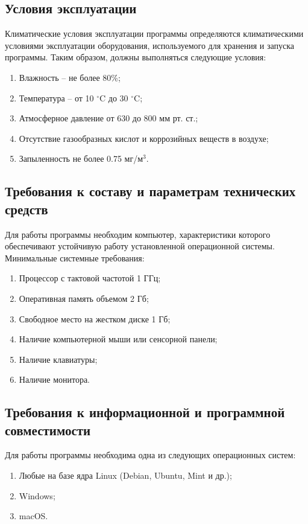 \documentclass[techtask]{espd}
\begin{document}
\subsection{Условия эксплуатации}
Климатические условия эксплуатации программы определяются климатическими условиями эксплуатации оборудования, используемого для хранения и запуска программы. Таким образом, должны выполняться следующие условия:

\begin{enumerate}
\item Влажность -- не более 80\%;
\item Температура -- от 10 $^\circ$C до 30 $^\circ$C;
\item Атмосферное давление от 630 до 800 мм рт. ст.;
\item Отсутствие газообразных кислот и коррозийных веществ в воздухе;
\item Запыленность не более 0.75 мг/м$^3$.
\end{enumerate}

\subsection{Требования к составу и параметрам технических средств}
Для работы программы необходим компьютер, характеристики которого обеспечивают устойчивую работу установленной операционной системы. Минимальные системные требования:

\begin{enumerate}
\item Процессор с тактовой частотой 1 ГГц;
\item Оперативная память объемом 2 Гб;
\item Свободное место на жестком диске 1 Гб;
\item Наличие компьютерной мыши или сенсорной панели;
\item Наличие клавиатуры;
\item Наличие монитора.
\end{enumerate}

\subsection{Требования к информационной и программной совместимости}
Для работы программы необходима одна из следующих операционных систем:

\begin{enumerate}
\item Любые на базе ядра Linux (Debian, Ubuntu, Mint и др.);
\item Windows;
\item macOS.
\end{enumerate}
\end{document}
